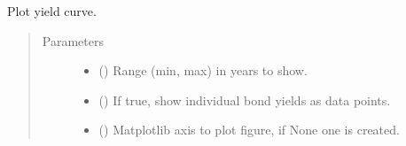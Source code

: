 \documentclass[letterpaper,10pt,english]{report}
\begin{document}
\begin{fulllineitems}
\begin{fulllineitems}
\begin{quote}
\begin{description}
\begin{itemize}
\end{itemize}

\end{description}\end{quote}

\end{fulllineitems}


\begin{fulllineitems}
\label{\detokenize{index:lgimapy.models.TreasuryCurveBuilder.plot}}
Plot yield curve.
\begin{quote}\begin{description}
\item[{Parameters}] \leavevmode\begin{itemize}
\item {} 
 (\sphinxstyleliteralemphasis{\sphinxupquote{(}}\sphinxstyleliteralemphasis{\sphinxupquote{, }}\sphinxstyleliteralemphasis{\sphinxupquote{)}}\sphinxstyleliteralemphasis{\sphinxupquote{, }}\sphinxstyleliteralemphasis{\sphinxupquote{(}}\sphinxstyleliteralemphasis{\sphinxupquote{, }}\sphinxstyleliteralemphasis{\sphinxupquote{)}}\sphinxstyleliteralemphasis{\sphinxupquote{}}) \textendash{} Range (min, max) in years to show.

\item {} 
 (\sphinxstyleliteralemphasis{\sphinxupquote{, }}) \textendash{} If true, show individual bond yields as data points.

\item {} 
 (\sphinxstyleliteralemphasis{\sphinxupquote{, }}) \textendash{} Matplotlib axis to plot figure, if None one is created.


\end{itemize}
\end{description}
\end{quote}
\end{fulllineitems}
\end{fulllineitems}
\end{document}
